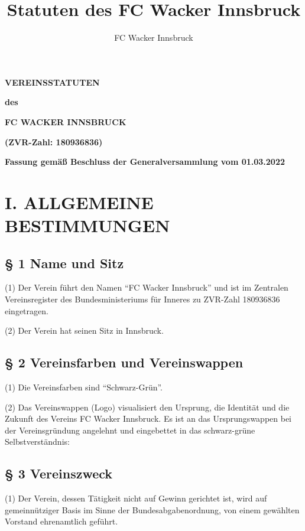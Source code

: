 \documentclass[11pt,a4paper]{article}
\author{FC Wacker Innsbruck}
\title{Statuten des FC Wacker Innsbruck}
\begin{document}
\setlength{\parskip}{25pt}
\setcounter{secnumdepth}{0}
\centering

\textbf{\huge VEREINSSTATUTEN}

\textbf{des}

\textbf{\huge FC WACKER INNSBRUCK}

\textbf{(ZVR-Zahl: 180936836)}

\vspace{100ex}

\textbf{Fassung gemäß Beschluss der Generalversammlung vom 01.03.2022}

\clearpage
\flushleft
\setlength{\parskip}{10pt}

\tableofcontents

\clearpage

\section{I. ALLGEMEINE BESTIMMUNGEN}

\subsection{§ 1
Name und Sitz}

(1)
Der Verein führt den Namen "`FC Wacker Innsbruck"' und ist im Zentralen Vereinsregister des Bundesministeriums für Inneres zu ZVR-Zahl 180936836 eingetragen.

(2)
Der Verein hat seinen Sitz in Innsbruck.

\subsection{§ 2
Vereinsfarben und Vereinswappen}

(1)
Die Vereinsfarben sind "`Schwarz-Grün"'.

(2)
Das Vereinswappen (Logo) visualisiert den Ursprung, die Identität und die Zukunft des Vereins FC Wacker Innsbruck.
Es ist an das Ursprungswappen bei der Vereinsgründung angelehnt und eingebettet in das schwarz-grüne Selbstverständnis:

\subsection{§ 3
Vereinszweck}

(1)
Der Verein, dessen Tätigkeit nicht auf Gewinn gerichtet ist, wird auf gemeinnütziger Basis im Sinne der Bundesabgabenordnung, von einem gewählten Vorstand ehrenamtlich geführt.
\end{document}
